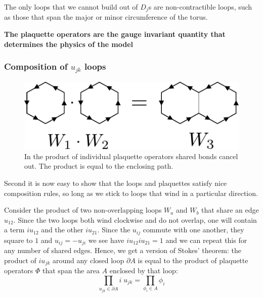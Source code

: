 The only loops that we cannot build out of \(D_j\)s are non-contractible
loops, such as those that span the major or minor circumference of the
torus.

\textbf{The plaquette operators are the gauge invariant quantity that
determines the physics of the model}

\hypertarget{composition-of-u_jk-loops}{%
\subsubsection{\texorpdfstring{Composition of \(u_{jk}\)
loops}{Composition of u\_\{jk\} loops}}\label{composition-of-u_jk-loops}}

\begin{figure}
\hypertarget{fig:plaquette_addition_by_hand}{%
\centering
\includegraphics{figure_code/amk_chapter/plaquette_addition/plaquette_addition_by_hand.pdf}
\caption{In the product of individual plaquette operators shared bonds
cancel out. The product is equal to the enclosing
path.}\label{fig:plaquette_addition_by_hand}
}
\end{figure}

Second it is now easy to show that the loops and plaquettes satisfy nice
composition rules, so long as we stick to loops that wind in a
particular direction.

Consider the product of two non-overlapping loops \(W_a\) and \(W_b\)
that share an edge \(u_{12}\). Since the two loops both wind clockwise
and do not overlap, one will contain a term \(i u_{12}\) and the other
\(i u_{21}\). Since the \(u_{ij}\) commute with one another, they square
to \(1\) and \(u_{ij} = -u_{ji}\) we see have \(i u_{12} i u_{21} = 1\)
and we can repeat this for any number of shared edges. Hence, we get a
version of Stokes' theorem: the product of \(i u_{jk}\) around any
closed loop \(\partial A\) is equal to the product of plaquette
operators \(\Phi\) that span the area \(A\) enclosed by that loop:
\[\prod_{u_{jk} \in \partial A} i \; u_{jk} = \prod_{\phi_i \in A} \phi_i\]

